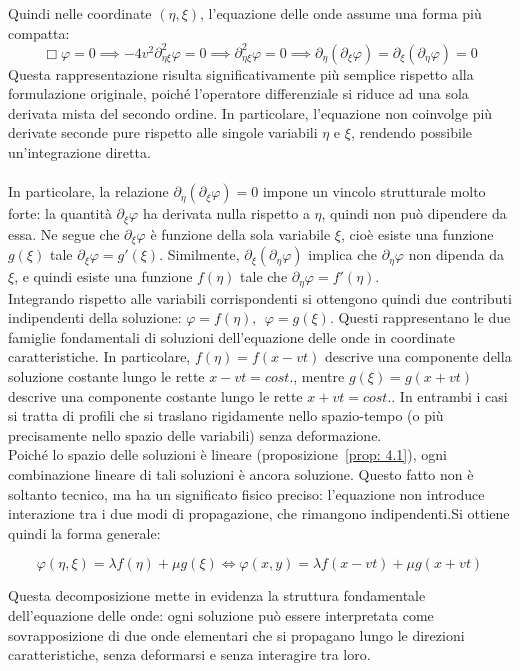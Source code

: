 \documentclass[a4paper,12pt]{report}
\begin{document}
Quindi nelle coordinate $(\eta,\xi)$, l'equazione delle onde assume una forma più compatta: \[\Box\varphi=0\implies-4v^2\partial_{\eta\xi}^2\varphi=0\implies \partial_{\eta\xi}^2\varphi=0\implies \partial_\eta(\partial_\xi\varphi)=\partial_\xi(\partial_\eta\varphi)=0\]
Questa rappresentazione risulta significativamente più semplice rispetto alla formulazione originale, poiché l’operatore differenziale si riduce ad una sola derivata mista del secondo ordine. In particolare, l’equazione non coinvolge più derivate seconde pure rispetto alle singole variabili $\eta$ e $\xi$, rendendo possibile un’integrazione diretta.
\\
\\In particolare, la relazione $\partial_\eta(\partial_\xi\varphi)=0$ impone un vincolo strutturale molto forte: la quantità $\partial_\xi\varphi$ ha derivata nulla rispetto a $\eta$, quindi non può dipendere da essa. Ne segue che $\partial_\xi\varphi$ è funzione della sola variabile $\xi$, cioè esiste una funzione $g(\xi)$ tale $\partial_\xi\varphi=g'(\xi)$.
Similmente, $\partial_\xi(\partial_\eta\varphi)$ implica che $\partial_\eta\varphi$ non dipenda da $\xi$, e quindi esiste una funzione $f(\eta)$ tale che $\partial_\eta\varphi=f'(\eta)$. 
\\Integrando rispetto alle variabili corrispondenti si ottengono quindi due contributi indipendenti della soluzione: $\varphi=f(\eta), \ \ \varphi=g(\xi)$. Questi rappresentano le due famiglie fondamentali di soluzioni dell’equazione delle onde in coordinate caratteristiche. In particolare, $f(\eta)=f(x-vt)$ descrive una componente della soluzione costante lungo le rette $x-vt=cost.$, mentre $g(\xi)=g(x+vt)$ descrive una componente costante lungo le rette $x+vt=cost.$. In entrambi i casi si tratta di profili che si traslano rigidamente nello spazio-tempo (o più precisamente nello spazio delle variabili) senza deformazione.
\\Poiché lo spazio delle soluzioni è lineare (proposizione~\ref{prop: 4.1}), ogni combinazione lineare di tali soluzioni è ancora soluzione. Questo fatto non è soltanto tecnico, ma ha un significato fisico preciso: l’equazione non introduce interazione tra i due modi di propagazione, che rimangono indipendenti.Si ottiene quindi la forma generale:

\[\varphi(\eta,\xi)=\lambda f(\eta)+\mu g(\xi)\iff \varphi(x,y)=\lambda f(x-vt)+\mu g(x+vt)\]

Questa decomposizione mette in evidenza la struttura fondamentale dell’equazione delle onde: ogni soluzione può essere interpretata come sovrapposizione di due onde elementari che si propagano lungo le direzioni caratteristiche, senza deformarsi e senza interagire tra loro. 
\end{document}
